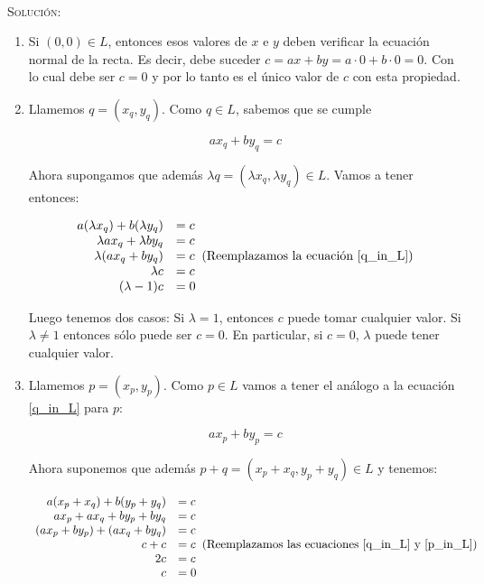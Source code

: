 \documentclass[a4paper,12pt,twoside,spanish,reqno]{amsbook}
\numberwithin{equation}{section}
\newcommand{\rta}{\noindent\textsc{Solución: }}
\begin{document}
\begin{enumerate}[resume]
\

\rta 

\begin{enumerate}
 \item Si $(0,0) \in L$, entonces esos valores de $x$ e $y$ deben verificar la ecuación normal de la recta. Es decir, debe suceder $c = ax + by = a\cdot 0 + b \cdot 0 = 0$. Con lo cual debe ser $c=0$ y por lo tanto es el único valor de $c$ con esta propiedad.

 \item Llamemos $q=(x_q , y_q)$. Como $q \in L$, sabemos que se cumple 

\begin{equation}\label{q_in_L}
a x_q + b y_q = c
\end{equation} 

Ahora supongamos que además $ \lambda q = (\lambda x_q, \lambda y_q) \in L$. Vamos a tener entonces:

\begin{equation*}
\begin{array}{rl}
a (\lambda x_q ) + b (\lambda y_q) &= c \\
\lambda a x_q  + \lambda b y_q &= c \\
\lambda ( a x_q  + b y_q ) &= c \; \; \text{(Reemplazamos la ecuación \ref{q_in_L})}\\
\lambda c &= c \\
(\lambda -1 ) c &= 0
\end{array}
\end{equation*}

Luego tenemos dos casos: Si $\lambda = 1$, entonces $c$ puede tomar cualquier valor. Si $\lambda \neq 1$ entonces sólo puede ser $c=0$. En particular, si $c=0$, $\lambda$ puede tener cualquier valor.
 
 \item Llamemos $p=(x_p,y_p)$. Como $p \in L$ vamos a tener el análogo a la ecuación \ref{q_in_L} para $p$:
 
\begin{equation}\label{p_in_L}
a x_p + b y_p = c
\end{equation} 

Ahora suponemos que además $p+q = (x_p + x_q,y_p + y_q) \in L$ y tenemos:

\begin{equation*}
\begin{array}{rl}
a (x_p + x_q ) + b (y_p + y_q) &= c \\
a x_p + a x_q + b y_p + b y_q &= c \\
(a x_p + b y_p) + (a x_q + b y_q) &= c \\
c + c &= c \; \; \text{(Reemplazamos las ecuaciones \ref{q_in_L} y \ref{p_in_L})}\\
2 c &= c \\
c &= 0
\end{array}
\end{equation*}


\end{enumerate}
\end{enumerate}
\end{document}

